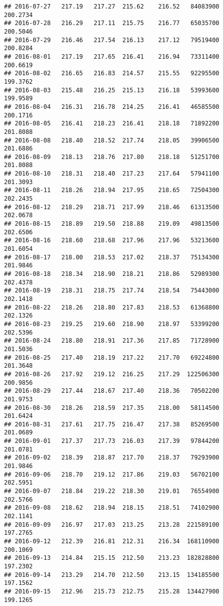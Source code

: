 \documentclass[
]{article}
\begin{document}
\begin{verbatim}
## 2016-07-27   217.19   217.27  215.62    216.52   84083900     200.2734
## 2016-07-28   216.29   217.11  215.75    216.77   65035700     200.5046
## 2016-07-29   216.46   217.54  216.13    217.12   79519400     200.8284
## 2016-08-01   217.19   217.65  216.41    216.94   73311400     200.6619
## 2016-08-02   216.65   216.83  214.57    215.55   92295500     199.3762
## 2016-08-03   215.48   216.25  215.13    216.18   53993600     199.9589
## 2016-08-04   216.31   216.78  214.25    216.41   46585500     200.1716
## 2016-08-05   216.41   218.23  216.41    218.18   71892200     201.8088
## 2016-08-08   218.40   218.52  217.74    218.05   39906500     201.6886
## 2016-08-09   218.13   218.76  217.80    218.18   51251700     201.8088
## 2016-08-10   218.31   218.40  217.23    217.64   57941100     201.3093
## 2016-08-11   218.26   218.94  217.95    218.65   72504300     202.2435
## 2016-08-12   218.29   218.71  217.99    218.46   61313500     202.0678
## 2016-08-15   218.89   219.50  218.88    219.09   49813500     202.6506
## 2016-08-16   218.60   218.68  217.96    217.96   53213600     201.6054
## 2016-08-17   218.00   218.53  217.02    218.37   75134300     201.9846
## 2016-08-18   218.34   218.90  218.21    218.86   52989300     202.4378
## 2016-08-19   218.31   218.75  217.74    218.54   75443000     202.1418
## 2016-08-22   218.26   218.80  217.83    218.53   61368800     202.1326
## 2016-08-23   219.25   219.60  218.90    218.97   53399200     202.5396
## 2016-08-24   218.80   218.91  217.36    217.85   71728900     201.5036
## 2016-08-25   217.40   218.19  217.22    217.70   69224800     201.3648
## 2016-08-26   217.92   219.12  216.25    217.29  122506300     200.9856
## 2016-08-29   217.44   218.67  217.40    218.36   70502200     201.9753
## 2016-08-30   218.26   218.59  217.35    218.00   58114500     201.6424
## 2016-08-31   217.61   217.75  216.47    217.38   85269500     201.0689
## 2016-09-01   217.37   217.73  216.03    217.39   97844200     201.0781
## 2016-09-02   218.39   218.87  217.70    218.37   79293900     201.9846
## 2016-09-06   218.70   219.12  217.86    219.03   56702100     202.5951
## 2016-09-07   218.84   219.22  218.30    219.01   76554900     202.5766
## 2016-09-08   218.62   218.94  218.15    218.51   74102900     202.1141
## 2016-09-09   216.97   217.03  213.25    213.28  221589100     197.2765
## 2016-09-12   212.39   216.81  212.31    216.34  168110900     200.1069
## 2016-09-13   214.84   215.15  212.50    213.23  182828800     197.2302
## 2016-09-14   213.29   214.70  212.50    213.15  134185500     197.1562
## 2016-09-15   212.96   215.73  212.75    215.28  134427900     199.1265

\end{verbatim}
\end{document}

